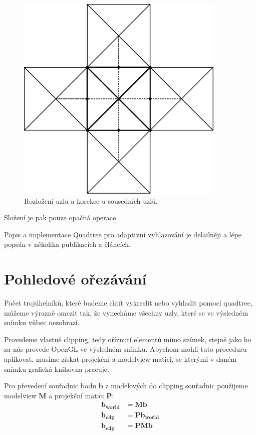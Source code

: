 \documentclass[11pt]{article}
\begin{document}
\begin{figure}[ht!]
\centering
	\includegraphics[width=10cm]{split.pdf}
	\caption{Rozložení uzlu a korekce u sousedních uzlů.}
\end{figure}
Složení je pak pouze opačná operace.

Popis a implementace Quadtree pro adaptivní vyhlazování je delailněji a lépe popsán v několika publikacích a článcích. %


\section{Pohledové ořezávání}
Počet trojúhelníků, které budeme chtít vykreslit nebo vyhladit pomocí quadtree, můžeme výrazně omezit tak, že vynecháme všechny uzly, které se ve výsledném snímku vůbec nezobrazí.

Provedeme vlastně clipping, tedy oříznutí elementů mimo snímek, stejně jako ho
za nás provede OpenGL ve výsledném snímku. Abychom mohli tuto proceduru
aplikovat, musíme získat projekční a modelview matici, se kterými v daném
snímku grafická knihovna pracuje.

Pro převedení souřadnic bodu $\mathbf{b}$ z modelových do clipping souřadnic
použijeme modelview $\mathbf{M}$ a projekční matici $\mathbf{P}$:
\begin{align*}
\mathbf{b_{world}} &= \mathbf{M} \mathbf{b} \\
\mathbf{b_{clip}} &= \mathbf{P} \mathbf{b_{world}} \\
\mathbf{b_{clip}} &= \mathbf{P} \mathbf{M} \mathbf{b} \\
\end{align*}
\end{document}
